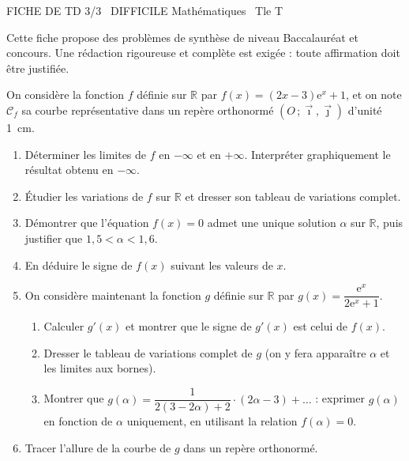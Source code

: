 \documentclass[11pt]{article}
\begin{document}
\begin{tcolorbox}[enhanced,colback=popink,colframe=popink,arc=10pt,boxrule=0pt,left=12pt,right=12pt,top=9pt,bottom=9pt]
{\color{white}\popxbold\small FICHE DE TD 3/3 \textbullet\ DIFFICILE \hfill Mathématiques \textbullet\ Tle T\par}
\end{tcolorbox}
\vspace{4pt}
Cette fiche propose des problèmes de synthèse de niveau Baccalauréat et concours. Une rédaction rigoureuse et complète est exigée : toute affirmation doit être justifiée.

\begin{exercice}
On considère la fonction $f$ définie sur $\mathbb{R}$ par $f(x) = (2x-3)\mathrm{e}^{x} + 1$, et on note $\mathcal{C}_f$ sa courbe représentative dans un repère orthonormé $(O\,;\vec{\imath},\vec{\jmath})$ d'unité \SI{1}{cm}.
\begin{enumerate}
\item Déterminer les limites de $f$ en $-\infty$ et en $+\infty$. Interpréter graphiquement le résultat obtenu en $-\infty$.
\item Étudier les variations de $f$ sur $\mathbb{R}$ et dresser son tableau de variations complet.
\item Démontrer que l'équation $f(x)=0$ admet une unique solution $\alpha$ sur $\mathbb{R}$, puis justifier que $1{,}5 < \alpha < 1{,}6$.
\item En déduire le signe de $f(x)$ suivant les valeurs de $x$.
\item On considère maintenant la fonction $g$ définie sur $\mathbb{R}$ par $g(x) = \dfrac{\mathrm{e}^{x}}{2\mathrm{e}^{x}+1}$.
\begin{enumerate}
\item Calculer $g'(x)$ et montrer que le signe de $g'(x)$ est celui de $f(x)$.
\item Dresser le tableau de variations complet de $g$ (on y fera apparaître $\alpha$ et les limites aux bornes).
\item Montrer que $g(\alpha) = \dfrac{1}{2(3-2\alpha)+2}\cdot(2\alpha-3)+ \ldots$ : exprimer $g(\alpha)$ en fonction de $\alpha$ uniquement, en utilisant la relation $f(\alpha)=0$.
\end{enumerate}
\item Tracer l'allure de la courbe de $g$ dans un repère orthonormé.
\end{enumerate}
\end{exercice}
\end{document}
